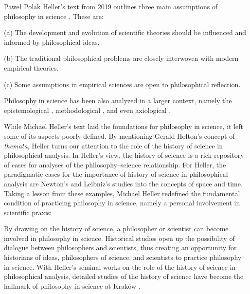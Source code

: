 \begin{artengenv}{Paweł Polak}
Heller’s text from 2019 outlines three main assumptions of philosophy in science
\parencite[p.\pageref{heller-three-points}]{pol_heller_how_2019}.
These are:

(a) The development and evolution of scientific theories should be influenced and informed by philosophical ideas.

(b) The traditional philosophical problems are closely interwoven with modern empirical theories.

(c) Some assumptions in empirical sciences are open to philosophical reflection.

Philosophy in science has been also analyzed in a larger context, namely the epistemological
\parencite{pol_heller_epistemologiczne_1987},
methodological
\parencite{pol_zycinski_structure_1988},
and even axiological
\parencites{pol_mcmullin_values_1982}[see also][]{pol_rodzen_w_1999}.

While Michael Heller’s text laid the foundations for philosophy in science, it left some of its aspects poorly defined.
By mentioning Gerald Holton’s concept of \textit{themata}, Heller turns our attention to the role of the history of
science in philosophical analysis. In Heller’s view, the history of science is a rich repository of cases for analyses
of the philosophy–science relationship. For Heller, the paradigmatic cases for the importance of history of science in
philosophical analysis are Newton’s and Leibniz’s studies into the concepts of space and time. Taking a lesson from
these examples, Michael Heller redefined the fundamental condition of practicing philosophy in science, namely a
personal involvement in scientific praxis:


By drawing on the history of science, a philosopher or scientist can become involved in philosophy in science.
Historical studies open up the possibility of dialogue between philosophers and scientists, thus creating an
opportunity for historians of ideas, philosophers of science, and scientists to practice philosophy in science. With
Heller’s seminal works on the role of the history of science in philosophical analysis, detailed studies of the history
of science have become the hallmark of philosophy in science at Kraków
\parencite{pol_polak_tradycja_2018}.


\end{artengenv}
